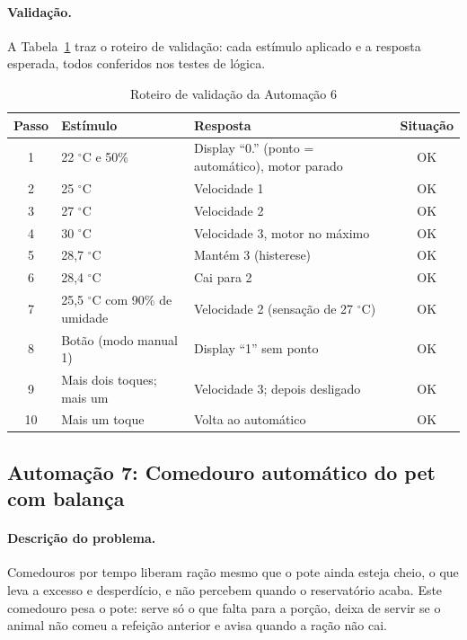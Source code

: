 \documentclass[12pt]{article}
\begin{document}
\paragraph{Validação.} A Tabela~\ref{tab:val6} traz o roteiro de validação: cada estímulo aplicado e a resposta esperada, todos conferidos nos testes de lógica.

\begin{table}[ht]
\centering
\caption{Roteiro de validação da Automação 6}\label{tab:val6}
\footnotesize
\begin{tabularx}{\textwidth}{cXXc}
\toprule
Passo & Estímulo & Resposta & Situação \\
\midrule
1 & 22 $^\circ$C e 50\% & Display ``0.'' (ponto = automático), motor parado & OK \\
2 & 25 $^\circ$C & Velocidade 1 & OK \\
3 & 27 $^\circ$C & Velocidade 2 & OK \\
4 & 30 $^\circ$C & Velocidade 3, motor no máximo & OK \\
5 & 28,7 $^\circ$C & Mantém 3 (histerese) & OK \\
6 & 28,4 $^\circ$C & Cai para 2 & OK \\
7 & 25,5 $^\circ$C com 90\% de umidade & Velocidade 2 (sensação de 27 $^\circ$C) & OK \\
8 & Botão (modo manual 1) & Display ``1'' sem ponto & OK \\
9 & Mais dois toques; mais um & Velocidade 3; depois desligado & OK \\
10 & Mais um toque & Volta ao automático & OK \\
\bottomrule
\end{tabularx}
\end{table}

\subsection{Automação 7: Comedouro automático do pet com balança}\label{sub:a7}

\paragraph{Descrição do problema.} Comedouros por tempo liberam ração mesmo que o pote ainda esteja cheio, o que leva a excesso e desperdício, e não percebem quando o reservatório acaba. Este comedouro pesa o pote: serve só o que falta para a porção, deixa de servir se o animal não comeu a refeição anterior e avisa quando a ração não cai.
\end{document}
